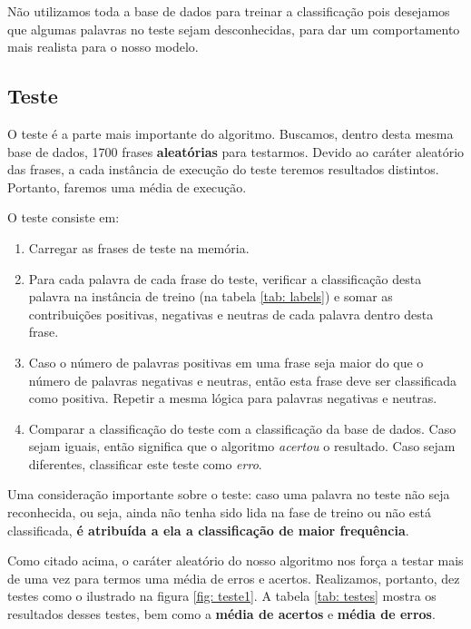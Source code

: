 \documentclass[
article,			%
12pt,				%
a4paper,			%
english,			%
brazil,				%
sumario=tradicional,
twoside
]{abntex2}
\begin{document}
	Não utilizamos toda a base de dados para treinar a classificação pois desejamos que algumas palavras no teste sejam desconhecidas, para dar um comportamento mais realista para o nosso modelo.
	
	\subsection{Teste}
	
	\label{teste}
	O teste é a parte mais importante do algoritmo. Buscamos, dentro desta mesma base de dados, 1700 frases \textbf{aleatórias} para testarmos. Devido ao caráter aleatório das frases, a cada instância de execução do teste teremos resultados distintos. Portanto, faremos uma média de execução.
	
	O teste consiste em:
	\begin{enumerate}
		\item Carregar as frases de teste na memória.
		\item Para cada palavra de cada frase do teste, verificar a classificação desta palavra na instância de treino (na tabela \ref{tab: labels}) e somar as contribuições positivas, negativas e neutras de cada palavra dentro desta frase.
		\item Caso o número de palavras positivas em uma frase seja maior do que o número de palavras negativas e neutras, então esta frase deve ser classificada como positiva. Repetir a mesma lógica para palavras negativas e neutras.
		\item Comparar a classificação do teste com a classificação da base de dados. Caso sejam iguais, então significa que o algoritmo \emph{acertou} o resultado. Caso sejam diferentes, classificar este teste como \emph{erro}.
	\end{enumerate}

		Uma consideração importante sobre o teste: caso uma palavra no teste não seja reconhecida, ou seja, ainda não tenha sido lida na fase de treino ou não está classificada, \textbf{é atribuída a ela a classificação de maior frequência}.
		
		Como citado acima, o caráter aleatório do nosso algoritmo nos força a testar mais de uma vez para termos uma média de erros e acertos. Realizamos, portanto, dez testes como o ilustrado na figura \ref{fig: teste1}. A tabela \ref{tab: testes} mostra os resultados desses testes, bem como a \textbf{média de acertos} e \textbf{média de erros}.  
		
\end{document}
